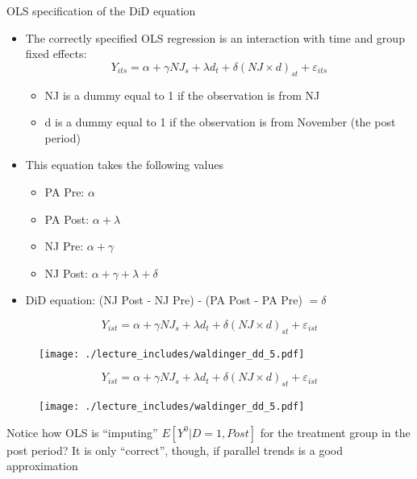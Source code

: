 \documentclass{beamer}
\begin{document}
\begin{frame}{OLS specification of the DiD equation}
	
	\begin{itemize}
	\item The correctly specified OLS regression is an interaction with time and group fixed effects:$$Y_{its} = \alpha + \gamma NJ_s + \lambda d_t + \delta (NJ \times d)_{st} + \varepsilon_{its}$$
		\begin{itemize}
		\item NJ is a dummy equal to 1 if the observation is from NJ
		\item d is a dummy equal to 1 if the observation is from November (the post period)
		\end{itemize}
	\item This equation takes the following values
		\begin{itemize}
		\item PA Pre: $\alpha$
		\item PA Post: $\alpha + \lambda$
		\item NJ Pre: $\alpha + \gamma$
		\item NJ Post: $\alpha + \gamma + \lambda + \delta$
		\end{itemize}
	\item DiD equation: (NJ Post - NJ Pre) - (PA Post - PA Pre) $= \delta$
	\end{itemize}
\end{frame}




\begin{frame}[plain]
	$$Y_{ist} = \alpha + \gamma NJ_s + \lambda d_t + \delta(NJ\times d)_{st} + \varepsilon_{ist}$$
	\begin{figure}
	\texttt{[image: ./lecture\_includes/waldinger\_dd\_5.pdf]}
	\end{figure}
\end{frame}


\begin{frame}[plain]
	$$Y_{ist} = \alpha + \gamma NJ_s + \lambda d_t + \delta(NJ\times d)_{st} + \varepsilon_{ist}$$
	\begin{figure}
	\texttt{[image: ./lecture\_includes/waldinger\_dd\_5.pdf]}
	\end{figure}

Notice how OLS is ``imputing'' $E[Y^0|D=1,Post]$ for the treatment group in the post period? It is only ``correct'', though, if parallel trends is a good approximation

\end{frame}
\end{document}

